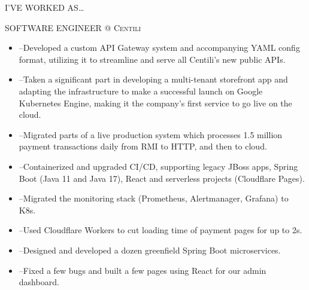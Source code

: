 \begin{minipage}[t]{\linewidth}\vspace{\sectionTopmargin}
{\titleFont\light I'VE WORKED AS\ldots}\newline

\vspace{\titleBottomMargin}
{\subtitleFont\bold SOFTWARE ENGINEER \extraLight\scshape @ Centili}\newline
\vfill\vspace{\dateTopMargin}{\dateFont\extraLight Aug 2019--present\alignRight}\linebreak\newline

{\vspace{\contentTopMargin}\contentFont \begin{itemize}
    \item --Developed a custom API Gateway system and accompanying YAML config format, utilizing it to streamline and serve all Centili's new public APIs.
    \item --Taken a significant part in developing a multi-tenant storefront app and adapting the infrastructure to make a successful launch on Google Kubernetes Engine, making it the company's first service to go live on the cloud.
    \item --Migrated parts of a live production system which processes 1.5 million payment transactions daily from RMI to HTTP, and then to cloud.
    \item --Containerized and upgraded CI/CD, supporting legacy JBoss apps, Spring Boot (Java 11 and Java 17), React and serverless projects (Cloudflare Pages).
    \item --Migrated the monitoring stack (Prometheus, Alertmanager, Grafana) to K8s.
    \item --Used Cloudflare Workers to cut loading time of payment pages for up to 2s.
    \item --Designed and developed a dozen greenfield Spring Boot microservices.
    \item --Fixed a few bugs and built a few pages using React for our admin dashboard.
\end{itemize}}
\end{minipage}\newline%
%
